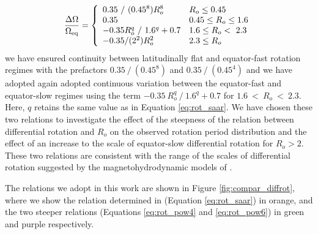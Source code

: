 \begin{equation}
\label{eq:rot_pow6}
{\centering
\frac{\Delta\Omega}{\Omega_{\rm{eq}}} = \left\{
\begin{array}{ll}
  0.35 \ / \ (0.45^8) R_o^8& R_o\leq 0.45 \\
  0.35 & 0.45\leq R_o\leq 1.6 \\
  -0.35 R_o^q \ / \ 1.6^q + 0.7 & 1.6 \leq R_o < \ 2.3\\
  -0.35/(2^2) R_o^2 & 2.3\leq R_o \\
\end{array} 
\right.}
\end{equation}
we have ensured continuity between latitudinally flat and equator-fast rotation regimes with the prefactors $0.35 \ / \ (0.45^8)$ and $0.35 \ / \ (0.45^4)$ and we have adopted again adopted continuous variation between the equator-fast and equator-slow regimes using the term $-0.35 \ R_o^q \ / \ 1.6^q + 0.7$ for $1.6 \ < \ R_o \ < \ 2.3$.
Here, $q$ retains the same value as in Equation \ref{eq:rot_saar}.
We have chosen these two relations to investigate the effect of the steepness of the relation between differential rotation and $R_o$ on the observed rotation period distribution and the effect of an increase to the scale of equator-slow differential rotation for $R_o > 2$.
These two relations are consistent with the range of the scales of differential rotation suggested by the magnetohydrodynamic models of \citet{brun_powering_2022}.

The relations we adopt in this work are shown in Figure \ref{fig:compar_diffrot}, where we show the relation determined in \citet{saar_starspots_2011} (Equation \ref{eq:rot_saar}) in orange, and the two steeper relations (Equations \ref{eq:rot_pow4} and \ref{eq:rot_pow6}) in green and purple respectively.

